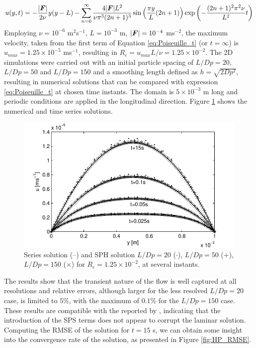 %
\begin{equation} \label{eq:Poiseuille_t}
	u(y,t)=-\frac{|\boldsymbol{F}|}{2\nu}y(y-L)-\sum^\infty_{n=0}\frac{4|\boldsymbol{F}|L^2}{\nu \pi^3 (2n+1)^3}\sin\left( \frac{\pi y}{L}(2n +1) \right)\exp\left( -\frac{(2n+1)^2\pi^2 \nu}{L^2}t \right)
\end{equation}
%
Employing $\nu=10^{-6}$ m$^2$s$^{-1}$, $L=10^{-3}$ m, $|\boldsymbol{F}|=10^{-4}$ ms$^{-2}$, the maximum velocity, taken from the first term of Equation \eqref{eq:Poiseuille_t} (or $t=\infty$) is $u_{max}=1.25\times10^{-5}$ ms$^{-1}$, resulting in $R_e=u_{max}L/\nu=1.25\times10^{-2}$. The 2D simulations were carried out with an initial particle spacing of $L/Dp=20$, $L/Dp=50$ and $L/Dp=150$ and a smoothing length defined as $h=\sqrt{2Dp^2}$, resulting in numerical solutions that can be compared with expression \eqref{eq:Poiseuille_t} at chosen time instants. The domain is $5\times10^{-3}$ m long and periodic conditions are applied in the longitudinal direction. Figure \ref{fig:Poiseuille} shows the numerical and time series solutions.

%
\begin{figure}[ht!]
	\centering
	\includegraphics[width=0.70\linewidth]{Figures/5.Chapter/Poiseuille}
	\caption{Series solution (--) and SPH solution $L/Dp=20$ ($\cdot$), $L/Dp=50$ (+), $L/Dp=150$ ($\times$) for $R_e=1.25\times10^{-2}$, at several instants.}
	\label{fig:Poiseuille} 
\end{figure}
%
The results show that the transient nature of the flow is well captured at all resolutions and relative errors, although larger for the less resolved $L/Dp=20$ case, is limited to $5\%$, with the maximum of $0.1\%$ for the $L/Dp=150$ case. These results are compatible with the reported by \cite{Morris-1997}, indicating that the introduction of the \ac{SPS} terms does not appear to corrupt the laminar solution. Computing the \ac{RMSE} of the solution for $t=15$ s, we can obtain some insight into the convergence rate of the solution, as presented in Figure \ref{fig:HP_RMSE}.

